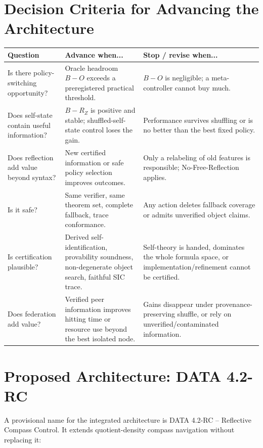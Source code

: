 \documentclass[11pt]{article}
\begin{document}
\section{Decision Criteria for Advancing the Architecture}
\begin{center}
\begin{tabularx}{0.96\textwidth}{p{} X X}
\toprule
\textbf{Question} & \textbf{Advance when...} & \textbf{Stop / revise when...} \\
\midrule
Is there policy-switching opportunity? & Oracle headroom $B-O$ exceeds a preregistered practical threshold. & $B-O$ is negligible; a meta-controller cannot buy much. \\
Does self-state contain useful information? & $B-R_Z$ is positive and stable; shuffled-self-state control loses the gain. & Performance survives shuffling or is no better than the best fixed policy. \\
Does reflection add value beyond syntax? & New certified information or safe policy selection improves outcomes. & Only a relabeling of old features is responsible; No-Free-Reflection applies. \\
Is it safe? & Same verifier, same theorem set, complete fallback, trace conformance. & Any action deletes fallback coverage or admits unverified object claims. \\
Is certification plausible? & Derived self-identification, provability soundness, non-degenerate object search, faithful SIC trace. & Self-theory is handed, dominates the whole formula space, or implementation/refinement cannot be certified. \\
Does federation add value? & Verified peer information improves hitting time or resource use beyond the best isolated node. & Gains disappear under provenance-preserving shuffle, or rely on unverified/contaminated information. \\
\bottomrule
\end{tabularx}
\end{center}

\section{Proposed Architecture: DATA 4.2-RC}
A provisional name for the integrated architecture is DATA 4.2-RC -- Reflective Compass Control. It extends quotient-density compass navigation without replacing it:
\end{document}
